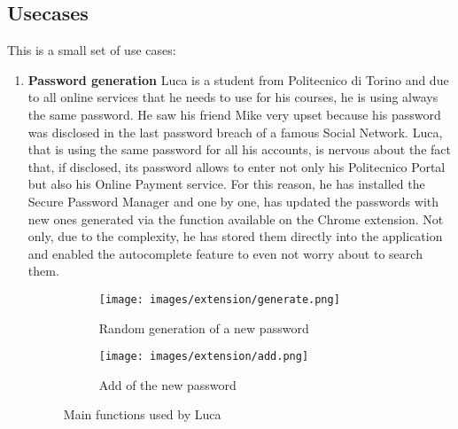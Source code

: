 \subsection{Usecases}
This is a small set of use cases:
\begin{enumerate}
	\item \textbf{Password generation}
	Luca is a student from Politecnico di Torino and due to all online services that he needs to use for his courses, he is using always the same password. He saw his friend Mike very upset because his password was disclosed in the last password breach of a famous Social Network. Luca, that is using the same password for all his accounts, is nervous about the fact that, if disclosed, its password allows to enter not only his Politecnico Portal but also his Online Payment service.\newline
	For this reason, he has installed the Secure Password Manager and one by one, has updated the passwords with new ones generated via the function available on the Chrome extension. Not only, due to the complexity, he has stored them directly into the application and enabled the autocomplete feature to even not worry about to search them.
	\begin{figure}[H]
		\centering
		\begin{subfigure}{.5\textwidth}
			\centering
			\texttt{[image: images/extension/generate.png]}
			\caption{Random generation of a new password}
			\label{fig:sub1}
		\end{subfigure}%
		\begin{subfigure}{.5\textwidth}
			\centering
			\texttt{[image: images/extension/add.png]}
			\caption{Add of the new password}
			\label{fig:sub2}
		\end{subfigure}
		\caption{Main functions used by Luca}
		\label{fig:test}
	\end{figure}


\end{enumerate}
